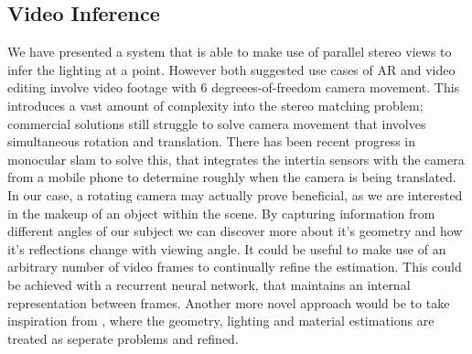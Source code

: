 \documentclass[ %
                    author={Gavin Parker},
                supervisor={Dr. Neill Campbell},
                    degree={MEng},
                     title={Deep Siamese Networks for Illumination Estimation from Stereo Images},
                  subtitle={},
                      type={research},
                      year={2018} ]{dissertation}
\begin{document}
\subsection{Video Inference}
We have presented a system that is able to make use of parallel stereo views to infer the lighting at a point. However both suggested use cases of AR and video editing involve video footage with 6 degreees-of-freedom camera movement. This introduces a vast amount of complexity into the stereo matching problem; commercial solutions still struggle to solve camera movement that involves simultaneous rotation and translation. There has been recent progress in monocular slam to solve this, that integrates the intertia sensors with the camera from a mobile phone to determine roughly when the camera is being translated. In our case, a rotating camera may actually prove beneficial, as we are interested in the makeup of an object within the scene. By capturing information from different angles of our subject we can discover more about it's geometry and how it's reflections change with viewing angle. It could be useful to make use of an arbitrary number of video frames to continually refine the estimation. This could be achieved with a recurrent neural network, that maintains an internal representation between frames. \newline
Another more novel approach would be to take inspiration from \cite{xia}, where the geometry, lighting and material estimations are treated as seperate problems and refined.

\end{document}
